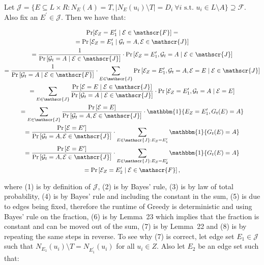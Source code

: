 Let $\mathscr{J}=\{E\subseteq L\times R:N_{E}(A)=T,|N_{E}(u_{i})\setminus T|=D_{i}\ \forall i\text{ s.t. }u_{i}\in L\setminus A\}\supseteq\mathscr{F}$.
Also fix an $E^{\prime}\in\mathscr{J}$.
Then we have that:\par


\[\begin{gathered}
\displaystyle\Pr[ \displaystyle\mathcal{E}_{Z}=E^{\prime}_{1}\mid\mathcal{E}\in\mathscr{F}]= \\
\displaystyle=\Pr\left[\mathcal{E}_{Z}=E^{\prime}_{1}\mid\mathcal{G}_{t}=A,\mathcal{E}\in\mathscr{J}\right] \\
\displaystyle=\frac{1}{\Pr\left[\mathcal{G}_{t}=A\mid\mathcal{E}\in\mathscr{J}\right]}\cdot\Pr\left[\mathcal{E}_{Z}=E^{\prime}_{1},\mathcal{G}_{t}=A\mid\mathcal{E}\in\mathscr{J}\right] \\
\displaystyle=\frac{1}{\Pr\left[\mathcal{G}_{t}=A\mid\mathcal{E}\in\mathscr{F}\right]}\cdot\sum_{E\in\mathscr{J}}\Pr\left[\mathcal{E}_{Z}=E^{\prime}_{1},\mathcal{G}_{t}=A,\mathcal{E}=E\mid\mathcal{E}\in\mathscr{J}\right] \\
\displaystyle=\sum_{E\in\mathscr{J}}\frac{\Pr\left[\mathcal{E}=E\mid\mathcal{E}\in\mathscr{J}\right]}{\Pr\left[\mathcal{G}_{t}=A\mid\mathcal{E}\in\mathscr{J}\right]}\cdot\Pr\left[\mathcal{E}_{Z}=E^{\prime}_{1},\mathcal{G}_{t}=A\mid\mathcal{E}=E\right] \\
\displaystyle=\sum_{E\in\mathscr{J}}\frac{\Pr\left[\mathcal{E}=E\right]}{\Pr\left[\mathcal{G}_{t}=A,\mathcal{E}\in\mathscr{J}\right]}\cdot\mathbbm{1}\{E_{Z}=E^{\prime}_{1},G_{t}(E)=A\} \\
\displaystyle=\frac{\Pr\left[\mathcal{E}=E^{\prime}\right]}{\Pr\left[\mathcal{G}_{t}=A,\mathcal{E}\in\mathscr{J}\right]}\cdot\sum_{E\in\mathscr{J}:E_{Z}=E^{\prime}_{1}}\mathbbm{1}\{G_{t}(E)=A\} \\
\displaystyle=\frac{\Pr\left[\mathcal{E}=E^{\prime}\right]}{\Pr\left[\mathcal{G}_{t}=A,\mathcal{E}\in\mathscr{J}\right]}\cdot\sum_{E\in\mathscr{J}:E_{Z}=E^{\prime}_{2}}\mathbbm{1}\{G_{t}(E)=A\} \\
\displaystyle=\Pr\left[\mathcal{E}_{Z}=E^{\prime}_{2}\mid\mathcal{E}\in\mathscr{F}\right],
\end{gathered}\]


where (1) is by definition of $\mathscr{J}$, (2) is by Bayes’ rule, (3) is by law of total probability, (4) is by Bayes’ rule and including the constant in the sum, (5) is due to edges being fixed, therefore the runtime of Greedy is deterministic and using Bayes’ rule on the fraction, (6) is by Lemma 23 which implies that the fraction is constant and can be moved out of the sum, (7) is by Lemma 22 and (8) is by repeating the same steps in reverse.
To see why (7) is correct, let edge set $E_{1}\in\mathscr{J}$ such that $N_{E_{1}}(u_{i})\setminus T=N_{E^{\prime}_{1}}(u_{i})$ for all $u_{i}\in Z$. Also let $E_{2}$ be an edge set such that:\par


